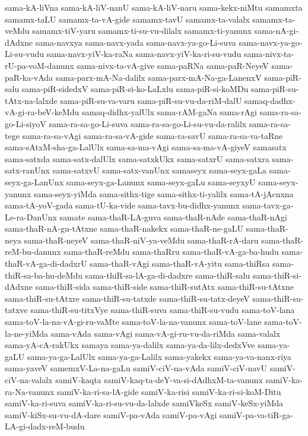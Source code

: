 {sama-kA-liVna
sama-kA-liV-nanU
sama-kA-liV-naru
sama-kekx-niMtu
samamxta
samamx-taLU
samamx-ta-vA-gide
samamx-tavU
samamx-ta-valalx
samamx-ta-veMdu
samamx-tiV-yaru
samamx-ti-su-vu-dilalx
samamx-ti-yanunx
sama-nA-gi-dAdxne
sama-navxya
sama-navx-yada
sama-navx-ya-go-Li-suva
sama-navx-ya-go-Li-su-vudu
sama-navx-yiV-ka-raNa
sama-navx-yiV-ka-ri-su-vudu
sama-nivx-ta-rU-pa-voM-danunx
sama-nivx-ta-vA-give
sama-paRNa
sama-paR-NeyeV
sama-paR-ka-vAda
sama-parx-mA-Na-dalilx
sama-parx-mA-Na-ga-LanenxV
sama-piR-salu
sama-piR-sidedxV
sama-piR-si-ko-LaLxlu
sama-piR-si-koMDu
sama-piR-su-tAtx-na-lalxde
sama-piR-su-va-varu
sama-piR-su-vu-da-riM-dalU
samaq-dadhx-vA-gi-ra-beV-keMdu
samaq-didhx-yalUlx
sama-rAM-gaNa
sama-rAgi
sama-ra-sa-go-Li-siyoV
sama-ra-sa-go-Li-suva
sama-ra-sa-go-Li-su-vu-da-ralilx
sama-ra-sa-tege
sama-ra-sa-vAgi
sama-ra-sa-vA-gide
sama-ra-savU
sama-ra-sa-va-taRne
sama-sAtxM-sha-ga-LalUlx
sama-sa-ma-vAgi
sama-sa-ma-vA-giyeV
samasatx
sama-satxda
sama-satx-dalUlx
sama-satxkUkx
sama-satxrU
sama-satxra
sama-satx-ranUnx
sama-satxvU
sama-satx-vanUnx
samaseyx
sama-seyx-gaLa
sama-seyx-ga-LanUnx
sama-seyx-ga-Lanunx
sama-seyx-gaLu
sama-seyxyU
sama-seyx-yanunx
sama-seyx-yiMda
sama-sithx-tige
sama-sithx-ti-yalilx
sama-tA-jAcnxna
sama-tA-yoV-gada
sama-tU-ka-vide
sama-tavx-bu-didhx-yanunx
sama-tavx-ga-Le-ra-DanUnx
samate
sama-thaR-LA-guva
sama-thaR-nAde
sama-thaR-nAgi
sama-thaR-nA-gu-tAtxne
sama-thaR-nakekx
sama-thaR-ne-gaLU
sama-thaR-neya
sama-thaR-neyeV
sama-thaR-niV-ya-veMdu
sama-thaR-rA-daru
sama-thaR-reM-bu-danunx
sama-thaR-reMdu
sama-thaRru
sama-thaR-vA-ga-ba-hudu
sama-thaR-vA-ga-di-dadxrU
sama-thaR-vAgi
sama-thaR-vA-yitu
sama-thiRsa
sama-thiR-sa-ba-hu-deMdu
sama-thiR-sa-lA-ga-di-dadxre
sama-thiR-salu
sama-thiR-si-dAdxne
sama-thiR-sida
sama-thiR-side
sama-thiR-sutAtx
sama-thiR-su-tAtxne
sama-thiR-su-tAtxre
sama-thiR-su-tatxde
sama-thiR-su-tatx-deyeV
sama-thiR-su-tatxve
sama-thiR-su-titxVye
sama-thiR-suva
sama-thiR-su-vudu
sama-toV-lana
sama-toV-la-na-vA-gi-ru-vaMte
sama-toV-la-na-vanunx
sama-toV-lane
sama-toV-la-ne-yiMda
sama-vAda
sama-vAgi
sama-vA-gi-ru-vu-da-riMda
sama-valalx
sama-yA-cA-rakUkx
samaya
sama-ya-dalilx
sama-ya-da-lilx-dedxVve
sama-ya-gaLU
sama-ya-ga-LalUlx
sama-ya-ga-Lalilx
sama-yakekx
sama-ya-va-nanx-riya
sama-yaveV
samemxV-La-na-gaLu
samiV-ciV-na-vAda
samiV-ciV-navU
samiV-ciV-na-valalx
samiV-kaqta
samiV-kaq-ta-deY-va-si-dAdhxM-ta-vanunx
samiV-ka-ra-Na-vanunx
samiV-ka-ri-sa-lA-gide
samiV-ka-risi
samiV-ka-ri-si-koM-Ditu
samiV-ka-ri-suva
samiV-ka-ri-su-vu-da-lalxde
samiVkeSx
samiV-keSx-yiMda
samiV-kiSx-su-vu-dA-dare
samiV-pa-vAda
samiV-pa-vAgi
samiV-pa-va-tiR-ga-LA-gi-dadx-reM-budu
}
